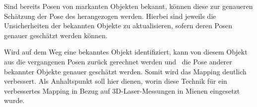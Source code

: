 Sind bereits Posen von markanten Objekten bekannt, können diese zur genaueren Schätzung der Pose des \Quad[s] herangezogen werden. Hierbei sind jeweils die Unsicherheiten der bekannten Objekte zu aktualisieren, sofern deren Posen genauer geschätzt werden können.


Wird auf dem Weg eine bekanntes Objekt identifiziert, kann von diesem Objekt aus die vergangenen Posen zurück gerechnet werden und \ggf\ die Pose anderer bekannter Objekte genauer geschätzt werden. Somit wird das Mapping deutlich verbessert. Als Anhaltspunkt soll hier \cite{Paper5} dienen, worin diese Technik für ein verbessertes Mapping in Bezug auf 3D-Laser-Messungen in Mienen eingesetzt wurde.

